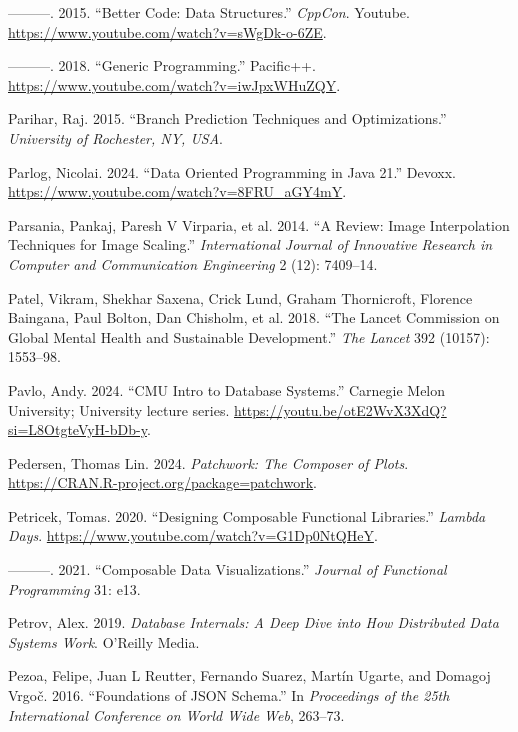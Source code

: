 \documentclass[
  openany]{book}
\newlength{\cslhangindent}
\newenvironment{CSLReferences}[2] %
 {\begin{list}{}{%
  \setlength{\itemindent}{0pt}
  \setlength{\leftmargin}{0pt}
  \setlength{\parsep}{0pt}
  \ifodd #1
   \setlength{\leftmargin}{\cslhangindent}
   \setlength{\itemindent}{-1\cslhangindent}
  \fi
  \setlength{\itemsep}{#2\baselineskip}}}
 {\end{list}}
\theoremstyle{definition}
\theoremstyle{definition}
\theoremstyle{definition}
\theoremstyle{definition}
\theoremstyle{remark}
\begin{document}
\begin{CSLReferences}{1}{0}
---------. 2015. {``Better Code: Data Structures.''} \emph{CppCon}. Youtube. \url{https://www.youtube.com/watch?v=sWgDk-o-6ZE}.

---------. 2018. {``{Generic Programming}.''} Pacific++. \url{https://www.youtube.com/watch?v=iwJpxWHuZQY}.

Parihar, Raj. 2015. {``Branch Prediction Techniques and Optimizations.''} \emph{University of Rochester, NY, USA}.

Parlog, Nicolai. 2024. {``Data Oriented Programming in Java 21.''} Devoxx. \url{https://www.youtube.com/watch?v=8FRU_aGY4mY}.

Parsania, Pankaj, Paresh V Virparia, et al. 2014. {``A Review: Image Interpolation Techniques for Image Scaling.''} \emph{International Journal of Innovative Research in Computer and Communication Engineering} 2 (12): 7409--14.

Patel, Vikram, Shekhar Saxena, Crick Lund, Graham Thornicroft, Florence Baingana, Paul Bolton, Dan Chisholm, et al. 2018. {``The Lancet Commission on Global Mental Health and Sustainable Development.''} \emph{The Lancet} 392 (10157): 1553--98.

Pavlo, Andy. 2024. {``CMU Intro to Database Systems.''} Carnegie Melon University; University lecture series. \url{https://youtu.be/otE2WvX3XdQ?si=L8OtgteVyH-bDb-y}.

Pedersen, Thomas Lin. 2024. \emph{Patchwork: The Composer of Plots}. \url{https://CRAN.R-project.org/package=patchwork}.

Petricek, Tomas. 2020. {``Designing Composable Functional Libraries.''} \emph{Lambda Days}. \url{https://www.youtube.com/watch?v=G1Dp0NtQHeY}.

---------. 2021. {``Composable Data Visualizations.''} \emph{Journal of Functional Programming} 31: e13.

Petrov, Alex. 2019. \emph{Database Internals: A Deep Dive into How Distributed Data Systems Work}. O'Reilly Media.

Pezoa, Felipe, Juan L Reutter, Fernando Suarez, Martín Ugarte, and Domagoj Vrgoč. 2016. {``Foundations of JSON Schema.''} In \emph{Proceedings of the 25th International Conference on World Wide Web}, 263--73.


\end{CSLReferences}
\end{document}
